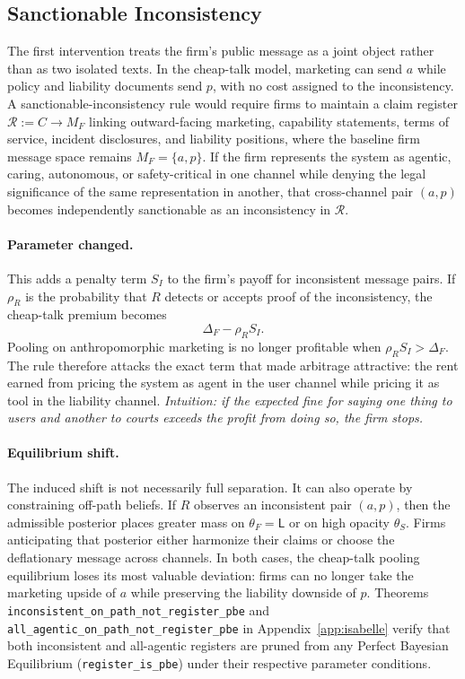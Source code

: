 \subsection{Sanctionable Inconsistency}
\label{subsec:sanctionable-inconsistency}

The first intervention treats the firm's public message as a joint object rather
than as two isolated texts. In the cheap-talk model, marketing can send $a$
while policy and liability documents send $p$, with no cost assigned to the
inconsistency. A sanctionable-inconsistency rule would require firms to maintain
a claim register $\mathcal{R} := C \to M_F$ linking outward-facing
marketing, capability statements, terms of service, incident disclosures, and
liability positions, where the baseline firm message space remains
$M_F=\{a,p\}$. If the firm represents the system as agentic, caring, autonomous,
or safety-critical in one channel while denying the legal significance of the
same representation in another, that cross-channel pair $(a,p)$ becomes
independently sanctionable as an inconsistency in $\mathcal{R}$.

\paragraph{Parameter changed.}
This adds a penalty term $S_I$ to the firm's payoff for inconsistent message
pairs. If $\rho_R$ is the probability that $R$ detects or accepts proof of the
inconsistency, the cheap-talk premium becomes
\[
\Delta_F-\rho_R S_I .
\]
Pooling on anthropomorphic marketing is no longer profitable when
$\rho_R S_I>\Delta_F$. The rule therefore attacks the exact term that made
arbitrage attractive: the rent earned from pricing the system as agent in the
user channel while pricing it as tool in the liability channel.
\emph{Intuition: if the expected fine for saying one thing to users and another to courts exceeds the profit from doing so, the firm stops.}

\paragraph{Equilibrium shift.}
The induced shift is not necessarily full separation. It can also operate by
constraining off-path beliefs. If $R$ observes an inconsistent pair $(a,p)$,
then the admissible posterior places greater mass on $\theta_F=\mathsf{L}$ or
on high opacity $\theta_S$. Firms anticipating that posterior either harmonize
their claims or choose the deflationary message across channels. In both cases,
the cheap-talk pooling equilibrium loses its most valuable deviation: firms can
no longer take the marketing upside of $a$ while preserving the liability
downside of $p$. Theorems \texttt{inconsistent\_\allowbreak{}on\_\allowbreak{}path\_\allowbreak{}not\_\allowbreak{}register\_\allowbreak{}pbe} and \texttt{all\_\allowbreak{}agentic\_\allowbreak{}on\_\allowbreak{}path\_\allowbreak{}not\_\allowbreak{}register\_\allowbreak{}pbe} in Appendix~\ref{app:isabelle} verify that both inconsistent and all-agentic registers are pruned from any Perfect Bayesian Equilibrium (\texttt{register\_\allowbreak{}is\_\allowbreak{}pbe}) under their respective parameter conditions.

